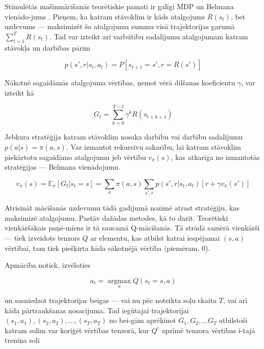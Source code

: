 \documentclass[12pt, a4paper]{article}
\numberwithin{equation}{section} %
\begin{document}
Stimulētās mašīnmācīšanās teorētiskie pamati ir galīgi MDP un Belmana vienādo-jums \cite{sutton2018reinforcement}. Pieņem, ka katram stāvoklim ir kāds atalgojums $R(s_t)$, bet uzdevums --- maksimizēt šo atalgojumu summu visā trajektorijas garumā $\sum_{t=1}^T R(s_t)$. Tad var izteikt arī varbūtību sadalījumu atalgojumam katram stāvokļa un darbības pārim

\begin{equation}
    p(s', r \vert s_t, a_t) = P[s_{t+1}=s', r=R(s')]
\end{equation}

Nākotnē sagaidāmās atalgojuma vērtības, ņemot vērā dilšanas koeficientu $\gamma$,  var izteikt kā

\begin{equation}
    G_t = \sum_{k=0}^{T-t} \gamma^k R(s_{t+k+1})
\end{equation}

Jebkura stratēģija katram stāvoklim nosaka darbību vai darbību sadalījumu $p(a \vert s) = \pi(a,s)$. Var izmantot rekursīvu sakarību, lai katram stāvoklim piekārtotu sagaidāmo atalgojumu jeb vērtību $v_{\pi}(s)$, kas atkarīga no izmantotās stratēģijas --- Belmana vienādojumu.

\begin{equation}
    v_{\pi}(s) = \mathbb{E}_{\pi}[G_t \vert s_t = s] = \sum_{a}\pi(a,s)\sum_{s', r}p(s', r \vert s_t, a_t)[r + \gamma v_{\pi}(s')]
\end{equation}

Atrisināt mācīšanās uzdevumu tādā gadījumā nozīmē atrast stratēģiju, kas maksimizē atalgojumu. Pastāv dažādas metodes, kā to darīt. Teorētiski vienkāršākais paņē-miens ir tā saucamā Q-mācīšanās. Tā strādā samērā vienkārši --- tiek izveidots tenzors $Q$ ar elementu, kas atbilst katrai iespējamai $(s,a)$ vērtībai, tam tiek piešķirta kāda sākotnējā vērtība (piemēram, 0). 

Apmācība notiek, izvēloties

\begin{equation}
    a_t = \operatorname*{argmax}_a Q(s_t = s, a)
\end{equation}

un sasniedzot trajektorijas beigas --- vai nu pēc noteikta soļu skaita $T$, vai arī kāda pārtraukšanas nosacījuma. Tad iegūtajai trajektorijai $(s_1, a_1), (s_2, a_2), ..., (s_T, a_T)$ no bei-gām aprēķinot $G_1, G_2, ... G_T$ atbilstoši katram solim var koriģēt vērtības tenzorā, kur $Q^i$ apzīmē tenzora vērtības i-tajā treniņa solī
\end{document}
